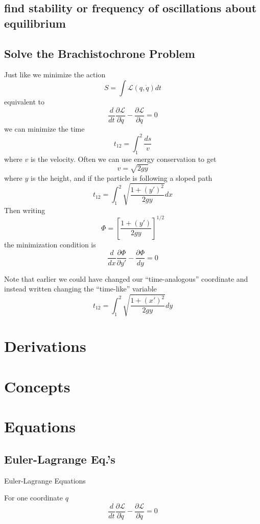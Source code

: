 \documentclass[25pt]{book}
\begin{document}
	\subsection{find stability or frequency of oscillations about equilibrium}
	
	\subsection{Solve the Brachistochrone Problem}
	
	Just like we minimize the action
	\[
	S = \int \mathcal{L}(q, \dot{q}) dt
	\]
	equivalent to
	\[
	\frac{d}{dt} \frac{\partial \mathcal{L}}{\partial \dot{q}} - \frac{\partial \mathcal{L}}{\partial q}= 0
	\]
	we can minimize the time
	\[
	t_{12} = \int_1^{2} \frac{ds}{v}
	\]
	where $v$ is the velocity. Often we can use energy conservation to get
	\[
	v = \sqrt{2gy}
	\]
	where $y$ is the height, and if the particle is following a sloped path
	\[
	t_{12} = \int_1^{2} \sqrt{\frac{1 + (y')^2}{2gy} } dx
	\]
	Then writing
	\[
	\Phi = \left[ \frac{1 + (y')}{2gy} \right]^{1/2}
	\]
	the minimization condition is 
	\[
	\frac{d}{dx} \frac{\partial \Phi}{\partial y'} - \frac{\partial \Phi}{dy} = 0
	\]
	
	
	Note that earlier we could have changed our ``time-analogous'' coordinate and instead written
	changing the ``time-like'' variable
	\[
	t_{12} = \int_1^{2} \sqrt{\frac{1 + (x')^2}{2gy} } dy
	\]
	\section{Derivations}
	
	\section{Concepts}
	
	\section{Equations}
	

	
	
	
	\subsection{Euler-Lagrange Eq.'s}
	
	Euler-Lagrange Equations
	
	For one coordinate $q$
	\[
	\frac{d}{dt} \frac{\partial \mathcal{L}}{\partial \dot{q}} - \frac{\partial \mathcal{L}}{\partial q}= 0
	\]
	
\end{document}
